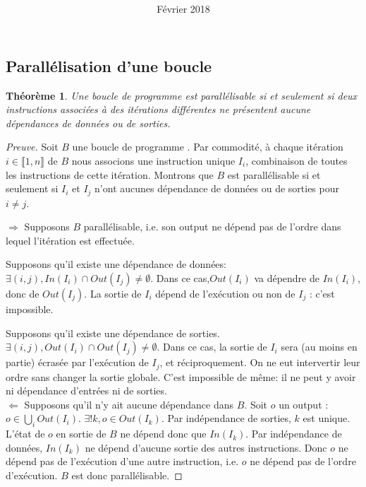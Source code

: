 \documentclass{article}
\title{
\LARGE{\textbf{\hmwkClass}}\\
\vspace{0.5in}
\large{\textbf{\hmwkTitle}}
\vspace{3in}
}
\author{\textbf{\hmwkAuthorName}}
\date{Février 2018} %
\newtheorem*{theorem}{Théorème}
\begin{document}
\maketitle
\newpage

\subsection*{Parallélisation d'une boucle}


\begin{theorem}
Une boucle de programme est parallélisable si et seulement si deux instructions associées à des itérations différentes ne présentent aucune dépendances de données ou de sorties.
\end{theorem}

\begin{proof}[Preuve]
Soit $B$ une boucle de programme . Par commodité, à chaque itération $i \in \llbracket 1,n \rrbracket$ de $B$ nous associons une instruction unique $I_i$, combinaison de toutes les instructions de cette itération.
Montrons que $B$ est parallélisable si et seulement si $I_i$ et $I_j$ n'ont aucunes dépendance de données ou de sorties pour $i \neq j$.

$\Rightarrow$ Supposons $B$ parallélisable, i.e. son output ne dépend pas de l'ordre dans lequel l'itération est effectuée.

Supposons qu'il existe une dépendance de données: $\exists (i,j), In(I_i) \cap Out(I_j) \neq \emptyset$.
Dans ce cas,$Out(I_i)$ va dépendre de $In(I_i)$, donc de $Out(I_j)$.
La sortie de $I_i$ dépend de l'exécution ou non de $I_j$ : c'est impossible.

Supposons qu'il existe une dépendance de sorties. $\exists (i,j), Out(I_i) \cap Out(I_j) \neq \emptyset$.
Dans ce cas, la sortie de $I_i$ sera (au moins en partie) écrasée par l'exécution de $I_j$, et réciproquement. On ne eut intervertir leur ordre sans changer la sortie globale. C'est impossible de même: il ne peut y avoir ni dépendance d'entrées ni de sorties.
\\
$\Leftarrow$ Supposons qu'il n'y ait aucune dépendance dans $B$.
Soit $o$ un output : $o \in \bigcup_{i} Out(I_i)$.
$\exists! k, o \in Out(I_k)$.
Par indépendance de sorties, $k$ est unique.
L'état de $o$ en sortie de $B$ ne dépend donc que $In(I_k)$.
Par indépendance de données, $In(I_k)$ ne dépend d'aucune sortie des autres instructions. Donc $o$ ne dépend pas de l'exécution d'une autre instruction, i.e. $o$ ne dépend pas de l'ordre d'exécution.
$B$ est donc parallélisable.
\end{proof}
\end{document}
